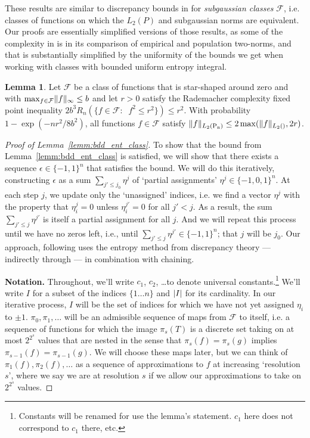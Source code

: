 \documentclass{article}
\DeclarePairedDelimiter\norm{\lVert}{\rVert}
\DeclarePairedDelimiter\abs{\lvert}{\rvert}
\theoremstyle{definition}
\newtheorem{lemma}[theorem]{Lemma}
\newcommand{\F}{\ensuremath{\mathcal{F}}}
\let\P\relax
\DeclareMathOperator{\Pn}{P_n}
\DeclareMathOperator{\P}{P}
\newcommand{\<}{\langle}
\renewcommand{\>}{\rangle}
\begin{document}
\begin{refsection}
These results are similar to discrepancy bounds in \citet[Theorems 5.1 and A]{mendelson2011discrepancy}
for \emph{subgaussian classes} $\F$, i.e. classes of functions on which the $L_2(P)$ and subgaussian norms are equivalent.
Our proofs are essentially simplified versions of those results, as some of the complexity in \citet[Theorem 5.1]{mendelson2011discrepancy}
is in its comparison of empirical and population two-norms, and that is substantially simplified by the uniformity of the
bounds we get when working with classes with bounded uniform entropy integral.

\begin{lemma}
\label{lem:empirical-and-population-norm-equivalence}
Let $\F$ be a class of functions that is star-shaped around zero and with $\max_{f \in \F}\norm{f}_{\infty} \le b$
and let $r > 0$ satisfy the Rademacher complexity fixed point inequality $2b^3 R_n ( \{f \in \F : \Pn f^2 \le r^2\} ) \le r^2$.
With probability $1-\exp(-nr^2/8b^2)$, all functions $f \in \F$ satisfy $\norm{f}_{L_2(\Pn)} \le 2\max(\norm{f}_{L_2(\P)}, 2r)$.
\end{lemma}

\begin{proof}[Proof of Lemma~\ref{lemm:bdd_ent_class}]
To show that the bound from Lemma~\ref{lemm:bdd_ent_class} is satisfied, we will show that there exists a sequence $\epsilon \in \{-1,1\}^n$ that satisfies the bound. We will do this iteratively, constructing $\epsilon$ as a sum $\sum_{j' \le j_0} \eta^j$ of `partial assignments' $\eta^j \in \{-1,0,1\}^n$. At each step $j$, we
update only the `unassigned' indices, i.e. we find a vector $\eta^j$ with the property that
$\eta^j_i = 0$ unless $\eta_i^{j'}=0$ for all $j' < j$. As a result, the sum $\sum_{j' \le j} \eta^{j'}$ is itself a partial assignment for all $j$. And we will repeat this process until we have no zeros left, i.e., until $\sum_{j' \le j} \eta^{j'} \in \{-1,1\}^n$; that
$j$ will be $j_0$. Our approach, following \citet{mendelson2011discrepancy}
uses the entropy method from discrepancy theory --- indirectly through \citet[Corollary 3.4]{mendelson2011discrepancy} --- in combination with chaining.

\textbf{Notation.} Throughout, we'll write $c_1$, $c_2$, \ldots to denote universal constants.\footnote{Constants will be renamed for use the lemma's statement. $c_1$ here does not correspond to $c_1$ there, etc.} We'll write $I$ for a subset of the indices $\{1 \ldots n\}$ and $\abs{I}$ for its cardinality.
In our iterative process, $I$ will be the set of indices for which we have not yet assigned $\eta_i$ to $\pm 1$. $\pi_0, \pi_1, \ldots$ will be an admissible sequence of maps from $\F$ to itself, i.e. a sequence of functions for which the image $\pi_s(T)$ is a discrete set taking on at most $2^{2^s}$ values that are nested in the sense that $\pi_{s}(f)=\pi_{s}(g)$ implies $\pi_{s-1}(f)=\pi_{s-1}(g)$. We will choose these maps later, but we can think of $\pi_1(f), \pi_2(f), \ldots$ as a sequence of approximations to $f$ at increasing `resolution $s$', where we say we are at resolution $s$ if we allow our approximations to take on $2^{2^s}$ values.



\end{proof}
\end{refsection}
\end{document}
